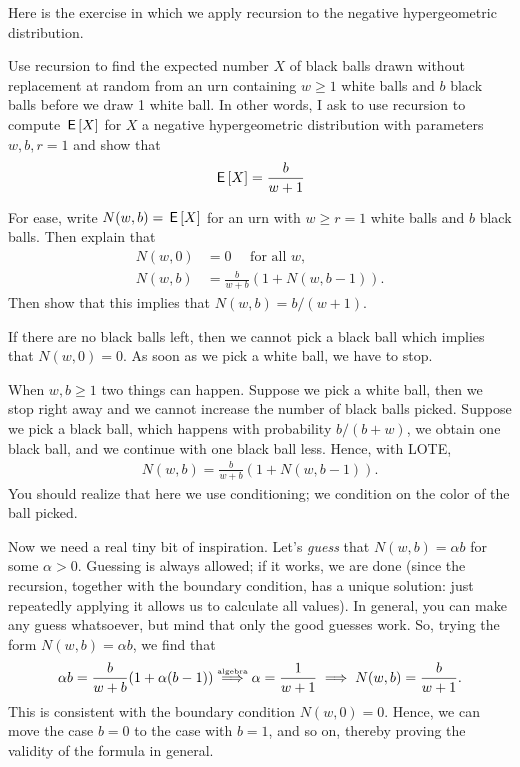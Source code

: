 Here is the exercise in which we apply recursion to the negative hypergeometric distribution.

\begin{exercise}
Use recursion to find the expected number $X$ of black balls drawn without replacement at random from an urn containing $w\geq 1$ white balls and $b$ black balls before we draw 1 white ball.
In other words, I ask to use recursion to compute $\,\mathsf{E}\left[X\right]$ for $X$ a negative hypergeometric distribution with parameters $w,b, r=1$ and show that
\begin{align}
  \label{eq:727}
\,\mathsf{E}\left[X\right] = \frac{b}{w+1}
\end{align}
\begin{hint}
For ease, write $N(w,b)= \,\mathsf{E}\left[X\right]$ for an  urn with $w\geq r = 1$ white balls and $b$ black balls. Then explain that
\begin{align}
N(w, 0) &= 0\quad \text{ for all $w$},\\
  N(w,b) &= \frac{b}{w+b} (1+N(w, b-1)).
\end{align}
Then show that this implies that $N(w,b) = b/ (w+1)$.
\end{hint}
\begin{solution}
If there are no black balls left, then we cannot pick a black ball which implies that $N(w, 0) = 0$.
As soon as we pick a white ball, we have to stop.

When $w, b \geq 1$ two things can happen.
Suppose we pick a white ball, then we stop right away and we cannot increase the number of black balls picked.
Suppose we pick a black ball, which happens with probability $b/(b+w)$, we obtain one black ball, and we continue with one black ball less.
Hence, with LOTE,
\begin{align}
  N(w,b) = \frac{b}{w+b} (1+N(w, b-1)).
\end{align}
You should realize that here we use conditioning; we condition on the color of the ball picked.

Now we need a real tiny bit of inspiration.
Let's \emph{guess} that $N(w,b)=\alpha b$ for some $\alpha>0$.
Guessing is always allowed; if it works, we are done (since the recursion, together with the boundary condition, has a unique solution: just repeatedly applying it allows us to calculate all values).
In general, you can make any guess whatsoever, but mind that only the good guesses work. So, trying the form $N(w,b) = \alpha b$, we find that
\begin{equation*}
\alpha b = \frac{b}{w+b} (1+ \alpha (b-1)) \stackrel{\textrm{\tiny algebra}}{\implies} \alpha = \frac{1}{w+1} \implies  N(w, b) = \frac{b }{w+1}.
\end{equation*}
This is consistent with the boundary condition $N(w,0)=0$. Hence, we can move the case $b=0$ to the case with $b=1$, and so on, thereby proving the validity of the formula in general.
\end{solution}
\end{exercise}

